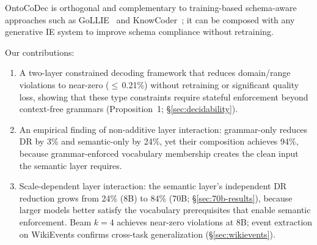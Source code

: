 OntoCoDec is orthogonal and complementary to training-based schema-aware approaches such as GoLLIE~\cite{sainz2024gollie} and KnowCoder~\cite{knowcoder_acl2024}; it can be composed with any generative IE system to improve schema compliance without retraining.

Our contributions:
\begin{enumerate}[leftmargin=*,itemsep=2pt]
    \item A two-layer constrained decoding framework that reduces domain/range violations to near-zero ($\leq$\,0.21\%) without retraining or significant quality loss, showing that these type constraints require stateful enforcement beyond context-free grammars (Proposition~1; \S\ref{sec:decidability}).
    \item An empirical finding of non-additive layer interaction: grammar-only reduces DR by 3\% and semantic-only by 24\%, yet their composition achieves 94\%, because grammar-enforced vocabulary membership creates the clean input the semantic layer requires.
    \item Scale-dependent layer interaction: the semantic layer's independent DR reduction grows from 24\% (8B) to 84\% (70B; \S\ref{sec:70b-results}), because larger models better satisfy the vocabulary prerequisites that enable semantic enforcement. Beam $k{=}4$ achieves near-zero violations at 8B; event extraction on WikiEvents confirms cross-task generalization (\S\ref{sec:wikievents}).
\end{enumerate}

